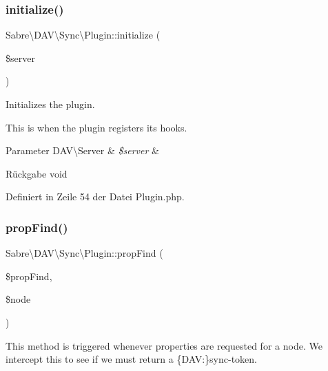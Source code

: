 \subsubsection{\texorpdfstring{initialize()}{initialize()}}
{\footnotesize\ttfamily Sabre\textbackslash{}\+D\+A\+V\textbackslash{}\+Sync\textbackslash{}\+Plugin\+::initialize (\begin{DoxyParamCaption}\item[{\mbox{\hyperlink{class_sabre_1_1_d_a_v_1_1_server}{D\+A\+V\textbackslash{}\+Server}}}]{\$server }\end{DoxyParamCaption})}

Initializes the plugin.

This is when the plugin registers it\textquotesingle{}s hooks.


\begin{DoxyParams}[1]{Parameter}
D\+A\+V\textbackslash{}\+Server & {\em \$server} & \\
\hline
\end{DoxyParams}
\begin{DoxyReturn}{Rückgabe}
void 
\end{DoxyReturn}


Definiert in Zeile 54 der Datei Plugin.\+php.

\mbox{\label{class_sabre_1_1_d_a_v_1_1_sync_1_1_plugin_af1f6a52f3153e077caa7f2b4087ef1f4}} 
\subsubsection{\texorpdfstring{prop\+Find()}{propFind()}}
{\footnotesize\ttfamily Sabre\textbackslash{}\+D\+A\+V\textbackslash{}\+Sync\textbackslash{}\+Plugin\+::prop\+Find (\begin{DoxyParamCaption}\item[{\mbox{\hyperlink{class_sabre_1_1_d_a_v_1_1_prop_find}{D\+A\+V\textbackslash{}\+Prop\+Find}}}]{\$prop\+Find,  }\item[{\mbox{\hyperlink{interface_sabre_1_1_d_a_v_1_1_i_node}{D\+A\+V\textbackslash{}\+I\+Node}}}]{\$node }\end{DoxyParamCaption})}

This method is triggered whenever properties are requested for a node. We intercept this to see if we must return a \{D\+AV\+:\}sync-\/token.


